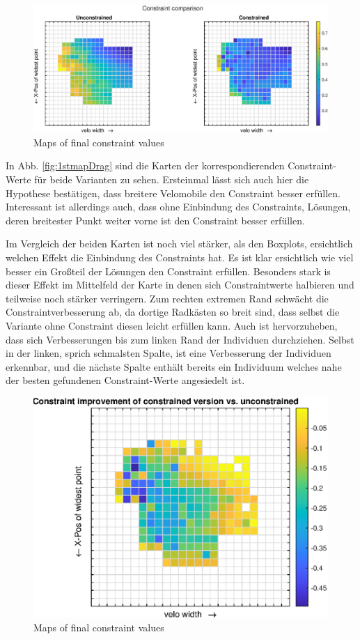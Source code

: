 \begin{figure}[h]
	\includegraphics[width=1\linewidth]{bilder/2pt500Samples/constraintMapComparison}
	\caption{Maps of final constraint values}
	\label{fig:1stmapCon}
\end{figure}

In Abb. \ref{fig:1stmapDrag} sind die Karten der korrespondierenden Constraint-Werte für beide Varianten zu sehen.
Ersteinmal lässt sich auch hier die Hypothese bestätigen, dass breitere Velomobile den Constraint besser erfüllen.
Interessant ist allerdings auch, dass ohne Einbindung des Constraints, Lösungen, deren breitester Punkt weiter vorne ist den Constraint besser erfüllen.

Im Vergleich der beiden Karten ist noch viel stärker, als den Boxplots, ersichtlich welchen Effekt die Einbindung des Constraints hat.
Es ist klar ersichtlich wie viel besser ein Großteil der Lösungen den Constraint erfüllen.
Besonders stark is dieser Effekt im Mittelfeld der Karte in denen sich Constraintwerte halbieren und teilweise noch stärker verringern.
Zum rechten extremen Rand schwächt die Constraintverbesserung ab, da dortige Radkästen so breit sind, dass selbst die Variante ohne Constraint diesen leicht erfüllen kann.
Auch ist hervorzuheben, dass sich Verbesserungen bis zum linken Rand der Individuen durchziehen.
Selbst in der linken, sprich schmalsten Spalte, ist eine Verbesserung der Individuen erkennbar, und die nächste Spalte enthält bereits ein Individuum welches nahe der besten gefundenen Constraint-Werte angesiedelt ist.

\begin{figure}[h]
	\centering
	\includegraphics[width=.7\linewidth]{bilder/2pt500Samples/constraintImprovements}
	\caption{Maps of final constraint values}
	\label{fig:1stmapConCompare}
\end{figure}

